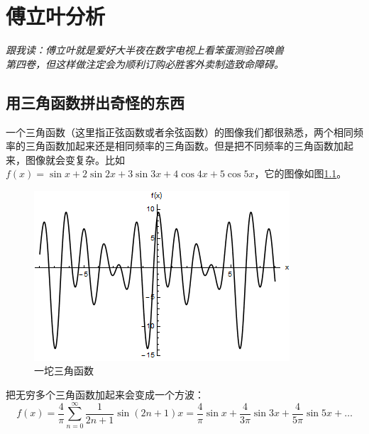\chapter{傅立叶分析}
\begin{flushright} \it 跟我读：傅立叶就是爱好大半夜在数字电视上看笨蛋测验召唤兽 \\ 第四卷，但这样做注定会为顺利订购必胜客外卖制造致命障碍。 \end{flushright}
\section{用三角函数拼出奇怪的东西}
一个三角函数（这里指正弦函数或者余弦函数）的图像我们都很熟悉，两个相同频率的三角函数加起来还是相同频率的三角函数。但是把不同频率的三角函数加起来，图像就会变复杂。比如$f(x)=\sin x+2 \sin 2 x+3 \sin 3 x+4 \cos 4 x+5 \cos 5 x$，它的图像如图\ref{fig-trigo-sum}。
\begin{figure}[htb]
\centering
\includegraphics[scale=0.5]{fig/trigo-sum}
\caption{一坨三角函数}
\label{fig-trigo-sum}
\end{figure}

把无穷多个三角函数加起来会变成一个方波：
\begin{equation*}
f(x)=\frac{4}{\pi} \sum_{n=0}^{\infty} \frac{1}{2 n+1} \sin (2 n+1) x=\frac{4}{\pi} \sin x+\frac{4}{3 \pi} \sin 3 x+\frac{4}{5 \pi} \sin 5 x+\dots
\end{equation*}

